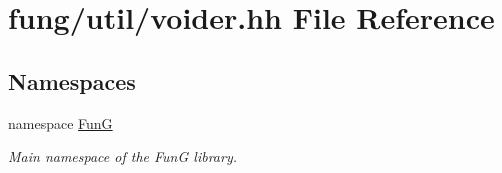 \hypertarget{voider_8hh}{\section{fung/util/voider.hh \-File \-Reference}
\label{voider_8hh}
}
\subsection*{\-Namespaces}
\begin{DoxyCompactItemize}
\item 
namespace \hyperlink{namespaceFunG}{\-Fun\-G}
\begin{DoxyCompactList}\small\item\em \-Main namespace of the \-Fun\-G library. \end{DoxyCompactList}\end{DoxyCompactItemize}
